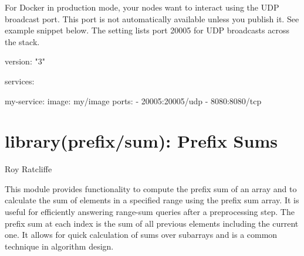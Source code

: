 For Docker in production mode, your nodes want to interact using the UDP
broadcast port. This port is not automatically available unless you
publish it. See example snippet below. The  setting lists port
20005 for UDP broadcasts across the stack.

\begin{code}
version: "3"

services:

  my-service:
    image: my/image
    ports:
      - 20005:20005/udp
      - 8080:8080/tcp
\end{code}

\vspace{0.7cm}\chapter{library(prefix/sum): Prefix Sums}\label{sec:sum}

\begin{tags}
Roy Ratcliffe
\end{tags}

This module provides functionality to compute the prefix sum of an
array and to calculate the sum of elements in a specified range using
the prefix sum array. It is useful for efficiently answering
range-sum queries after a preprocessing step. The prefix sum at each
index is the sum of all previous elements including the current one.
It allows for quick calculation of sums over subarrays and is a
common technique in algorithm design.\vspace{0.7cm}

